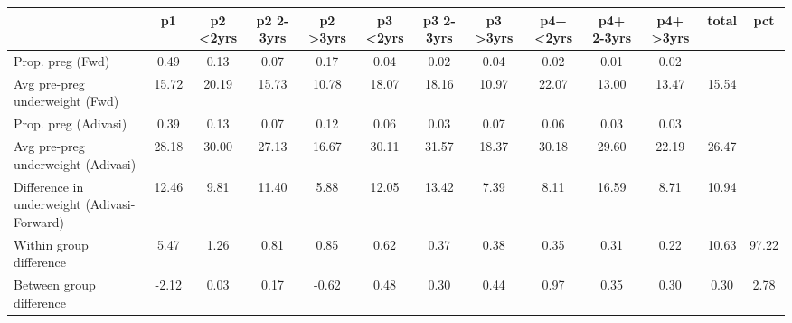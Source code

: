 \begin{tabular}{l*{12}{c}}
\toprule
            &\multicolumn{1}{c}{p1}&\multicolumn{1}{c}{p2 \textless2yrs}&\multicolumn{1}{c}{p2 2-3yrs}&\multicolumn{1}{c}{p2 \textgreater3yrs}&\multicolumn{1}{c}{p3 \textless2yrs}&\multicolumn{1}{c}{p3 2-3yrs}&\multicolumn{1}{c}{p3 \textgreater3yrs}&\multicolumn{1}{c}{p4+ \textless2yrs}&\multicolumn{1}{c}{p4+ 2-3yrs}&\multicolumn{1}{c}{p4+ \textgreater3yrs}&\multicolumn{1}{c}{total}&\multicolumn{1}{c}{pct}\\
\midrule
\midrule
Prop. preg (Fwd)&        0.49&        0.13&        0.07&        0.17&        0.04&        0.02&        0.04&        0.02&        0.01&        0.02&            &            \\
Avg pre-preg underweight (Fwd)&       15.72&       20.19&       15.73&       10.78&       18.07&       18.16&       10.97&       22.07&       13.00&       13.47&       15.54&            \\
Prop. preg (Adivasi)&        0.39&        0.13&        0.07&        0.12&        0.06&        0.03&        0.07&        0.06&        0.03&        0.03&            &            \\
Avg pre-preg underweight (Adivasi)&       28.18&       30.00&       27.13&       16.67&       30.11&       31.57&       18.37&       30.18&       29.60&       22.19&       26.47&            \\
Difference in underweight (Adivasi-Forward)&       12.46&        9.81&       11.40&        5.88&       12.05&       13.42&        7.39&        8.11&       16.59&        8.71&       10.94&            \\
Within group difference&        5.47&        1.26&        0.81&        0.85&        0.62&        0.37&        0.38&        0.35&        0.31&        0.22&       10.63&       97.22\\
Between group difference&       -2.12&        0.03&        0.17&       -0.62&        0.48&        0.30&        0.44&        0.97&        0.35&        0.30&        0.30&        2.78\\
\bottomrule
\end{tabular}
